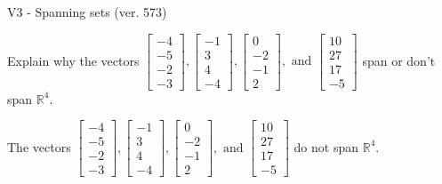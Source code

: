 \begin{exercise}
  \begin{exerciseTitle}V3 - Spanning sets (ver. 573)\end{exerciseTitle}
  \begin{exerciseStatement}
    Explain why the vectors \(\left[\begin{array}{r}
-4 \\
-5 \\
-2 \\
-3
\end{array}\right] , \left[\begin{array}{r}
-1 \\
3 \\
4 \\
-4
\end{array}\right] , \left[\begin{array}{r}
0 \\
-2 \\
-1 \\
2
\end{array}\right] , \text{ and } \left[\begin{array}{r}
10 \\
27 \\
17 \\
-5
\end{array}\right]\) span or don't span \(\mathbb{R}^4\). 
	


  \end{exerciseStatement}
  \begin{exerciseAnswer}
   The vectors \(\left[\begin{array}{r}
-4 \\
-5 \\
-2 \\
-3
\end{array}\right] , \left[\begin{array}{r}
-1 \\
3 \\
4 \\
-4
\end{array}\right] , \left[\begin{array}{r}
0 \\
-2 \\
-1 \\
2
\end{array}\right] , \text{ and } \left[\begin{array}{r}
10 \\
27 \\
17 \\
-5
\end{array}\right]\) 
  	 do not  
	span \(\mathbb{R}^4\).
  


  \end{exerciseAnswer}
\end{exercise}